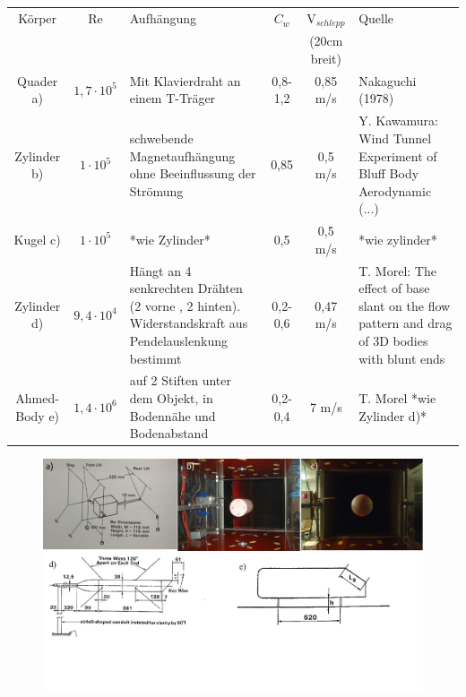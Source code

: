 \documentclass[10pt]{article}
\begin{document}
\begin{tabularx}{\linewidth}{ccp{3cm}c cp{3cm}}
\toprule
Körper 	&  Re & Aufhängung &	$C_w$ & $\text{V}_{schlepp}$ &Quelle\\	
 &							&			& &(20cm breit)   \\
\midrule
\medskip
Quader a)&	$1,7 \cdot 10^5$	& Mit Klavierdraht an einem T-Träger & 0,8-1,2	& 0,85 m/s &	Nakaguchi  (1978) \\
\medskip
Zylinder b) &$1 \cdot 10^5$ & schwebende Magnetaufhängung ohne Beeinflussung der Strömung & 0,85 & 0,5 m/s &Y. Kawamura: Wind Tunnel Experiment of Bluff
Body Aerodynamic (...)	\\
\medskip
Kugel c) & $1 \cdot 10^5$ & *wie Zylinder* & 0,5 & 0,5 m/s& *wie zylinder*  \\
\medskip
Zylinder d) & $9,4 \cdot 10^4$ & Hängt an 4 senkrechten Drähten (2 vorne , 2 hinten). Widerstandskraft aus Pendelauslenkung bestimmt & 0,2-0,6 & 0,47 m/s  & T. Morel: The effect of base slant on the flow pattern and drag of 3D bodies with blunt ends	\\
Ahmed-Body e) &$1,4 \cdot 10^6$ & auf 2 Stiften unter dem Objekt, in Bodennähe und Bodenabstand &0,2-0,4 & 7 m/s &T. Morel  *wie Zylinder d)*\\
\bottomrule


\end{tabularx}
\begin{figure}[h]

\includegraphics[width=\linewidth]{GrafikenKorper}
\end{figure}






	
\end{document}
